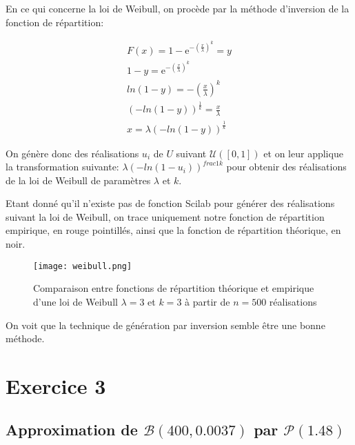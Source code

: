 \documentclass{article}
\begin{document}
\begin{multicols}{2}
En ce qui concerne la loi de Weibull, on procède par la méthode d'inversion de
la fonction de répartition:

\begin{equation}
    \begin{multlined}
        F(x) = 1 - \mathrm{e}^{-\left({\frac{x}{\lambda}}\right)^k} = y \\
        1 - y = \mathrm{e}^{-\left({\frac{x}{\lambda}}\right)^k} \\
        ln(1 - y) = -\left(\frac{x}{\lambda}\right)^k \\
        (-ln(1 - y))^{\frac{1}{k}} = \frac{x}{\lambda} \\
        x = \lambda (-ln(1 - y))^{\frac{1}{k}}
    \end{multlined}
\end{equation}

On génère donc des réalisations $u_i$ de $U$ suivant $\mathcal{U}([0, 1])$ et on
leur applique la transformation suivante: $\lambda (-ln(1 - u_i))^{frac{1}{k}}$
pour obtenir des réalisations de la loi de Weibull de paramètres $\lambda$ et
$k$.

Etant donné qu'il n'existe pas de fonction Scilab pour générer des réalisations
suivant la loi de Weibull, on trace uniquement notre fonction de répartition
empirique, en rouge pointillés, ainsi que la fonction de répartition théorique,
en noir.

\begin{figure}[H]
    \begin{center}
        \texttt{[image: weibull.png]}
        \centering
        \captionsetup{justification=centering}
        \caption{\label{fig:gaussienne}Comparaison entre fonctions de répartition théorique et empirique d'une loi de Weibull $\lambda = 3$ et $k = 3$ à partir de $n = 500$ réalisations}
    \end{center}
\end{figure}

On voit que la technique de génération par inversion semble être une bonne
méthode.


\section{Exercice 3}\label{sec:ex3}

\subsection{Approximation de $\mathcal{B}(400, 0.0037)$ par $\mathcal{P}(1.48)$}\label{subsec:ex31}


\end{multicols}
\end{document}
